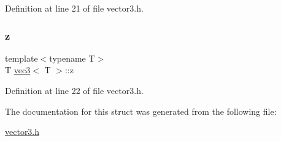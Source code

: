 Definition at line 21 of file vector3.\+h.

\mbox{\label{structvec3_a7879033e3409225479ae0079c92d9afd}} 
\subsubsection{\texorpdfstring{z}{z}}
{\footnotesize\ttfamily template$<$typename T$>$ \\
T \mbox{\hyperlink{structvec3}{vec3}}$<$ T $>$\+::z}



Definition at line 22 of file vector3.\+h.



The documentation for this struct was generated from the following file\+:\begin{DoxyCompactItemize}
\item 
\mbox{\hyperlink{vector3_8h}{vector3.\+h}}\end{DoxyCompactItemize}
